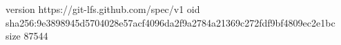 version https://git-lfs.github.com/spec/v1
oid sha256:9e3898945d5704028e57acf4096da2f9a2784a21369c272fdf9bf4809ec2e1bc
size 87544

